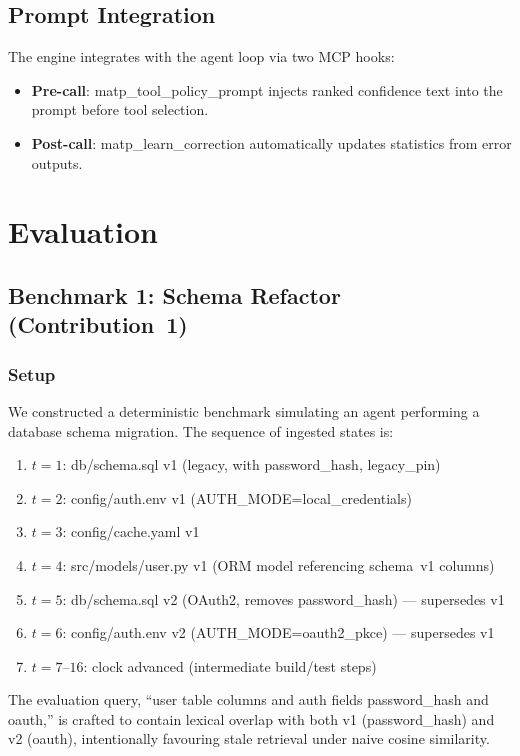 \documentclass[lettersize,journal]{IEEEtran}
\begin{document}
\subsection{Prompt Integration}

The engine integrates with the agent loop via two MCP hooks:
\begin{itemize}
    \item \textbf{Pre-call}: matp\_tool\_policy\_prompt injects ranked confidence text into the prompt before tool selection.
    \item \textbf{Post-call}: matp\_learn\_correction automatically updates statistics from error outputs.
\end{itemize}

\section{Evaluation}

\subsection{Benchmark 1: Schema Refactor (Contribution~1)}

\subsubsection{Setup}
We constructed a deterministic benchmark simulating an agent performing a database schema migration. The sequence of ingested states is:

\begin{enumerate}
    \item $t=1$: db/schema.sql v1 (legacy, with password\_hash, legacy\_pin)
    \item $t=2$: config/auth.env v1 (AUTH\_MODE=local\_credentials)
    \item $t=3$: config/cache.yaml v1
    \item $t=4$: src/models/user.py v1 (ORM model referencing schema~v1 columns)
    \item $t=5$: db/schema.sql v2 (OAuth2, removes password\_hash) — supersedes v1
    \item $t=6$: config/auth.env v2 (AUTH\_MODE=oauth2\_pkce) — supersedes v1
    \item $t=7$--$16$: clock advanced (intermediate build/test steps)
\end{enumerate}

The evaluation query, ``user table columns and auth fields password\_hash and oauth,'' is crafted to contain lexical overlap with both v1 (password\_hash) and v2 (oauth), intentionally favouring stale retrieval under naive cosine similarity.
\end{document}
